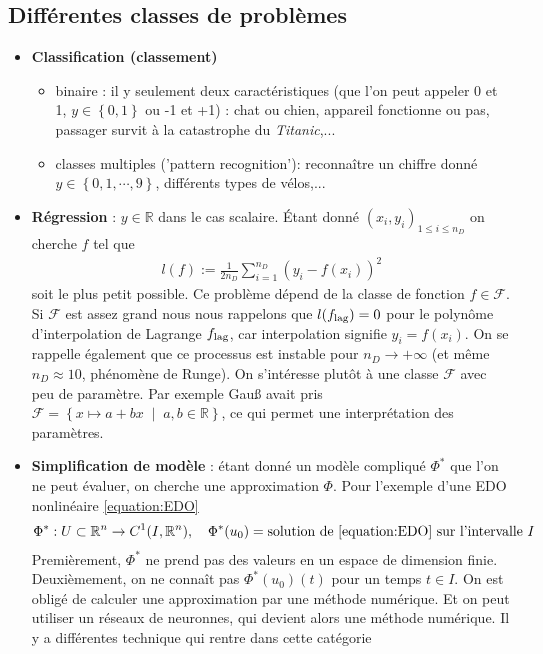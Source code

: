 \documentclass[11pt,a4paper, french]{article}
\newcommand{\ndata}{n_D}
\newcommand{\R}{\mathbb R}
\newcommand{\Set}[1]{\left\{#1\right\}}
\newcommand{\SetDef}[2]{\left\{#1\;\middle|\;#2\right\}}
\begin{document}
\subsection{Différentes classes de problèmes}\label{subsec:}
%
\begin{itemize}
%
\item \textbf{Classification (classement)}
\begin{itemize}
\item binaire : il y seulement deux caractéristiques (que l'on peut appeler 0 et 1, $y\in\Set{0,1}$ ou -1 et +1) : chat ou chien, appareil fonctionne ou pas, passager survit à la catastrophe du \textit{Titanic},...
\item classes multiples ('pattern recognition'): reconnaître un chiffre donné $y\in\Set{0,1,\cdots,9}$, différents types de vélos,...
\end{itemize}
%
\item \textbf{Régression} : $y\in\R$ dans le cas scalaire. Étant donné $(x_i,y_i)_{1\le i\le \ndata}$ on cherche $f$ tel que
\begin{align*}
l(f) := \frac{1}{2\ndata}\sum_{i=1}^{\ndata}\left(y_i - f(x_i)\right)^2
\end{align*}
%
soit le plus petit possible. Ce problème dépend de la classe de fonction $f\in\mathcal F$. Si $\mathcal F$ est assez grand nous nous rappelons 
que $l(f_{\rm lag})=0$ pour le polynôme d'interpolation de Lagrange $f_{\rm lag}$, car interpolation signifie $y_i=f(x_i)$.
On se rappelle également que ce processus est instable pour $\ndata\to+\infty$ (et même $\ndata\approx 10$, phénomène de Runge).
%
On s'intéresse plutôt à une classe $\mathcal F$ avec peu de paramètre. Par exemple Gau{\ss} avait pris 
$\mathcal F=\SetDef{x\mapsto a + bx}{a,b\in\R}$, ce qui permet une interprétation des paramètres.
%
\item \textbf{Simplification de modèle} : étant donné un modèle compliqué $\Phi^*$ que l'on ne peut évaluer, on cherche une approximation $\Phi$. Pour l'exemple d'une EDO nonlinéaire \eqref{equation:EDO} 
\begin{align*}
\Phi^* : U\subset\R^n \to C^1(I, \R^n),\quad \Phi^*(u_0) = \mbox{solution de \eqref{equation:EDO} sur l'intervalle $I$}
\end{align*}
Premièrement, $\Phi^*$ ne prend pas des valeurs en un espace de dimension finie. Deuxièmement, on ne connaît pas $\Phi^*(u_0)(t)$ pour un temps $t\in I$. On est obligé de calculer une approximation par une méthode numérique. Et on peut utiliser un réseaux de neuronnes, qui devient alors une méthode numérique. Il y a différentes technique qui rentre dans cette catégorie

\end{itemize}
\end{document}
